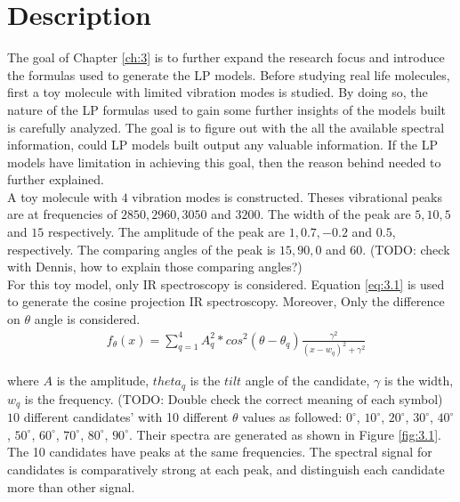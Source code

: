  \label{ch:3}

\section{Description}
The goal of Chapter \ref{ch:3} is to further expand the research focus and introduce the formulas used to generate the LP models. Before studying real life molecules, first a toy molecule with limited vibration modes is studied. By doing so, the nature of the LP formulas used to gain some further insights of the models built is carefully analyzed. The goal is to figure out with the all the available spectral information, could LP models built output any valuable information. If the LP models have limitation in achieving this goal, then the reason behind needed to further explained. \\


A toy molecule with $4$ vibration modes is constructed. Theses vibrational peaks are at frequencies of $2850, 2960, 3050$ and $3200$. The width of the peak are $5, 10, 5$ and $15$ respectively. The amplitude of the peak are $1, 0.7, -0.2$ and $0.5$, respectively. The comparing angles of the peak is $15, 90, 0$ and $60$. (TODO: check with Dennis, how to explain those comparing angles?)  \\

For this toy model, only IR spectroscopy is considered. Equation \ref{eq:3.1} is used to generate the cosine projection IR spectroscopy. Moreover, Only the difference on $\theta$ angle is considered. \\

\begin{eqnarray} \label{eq:3.1}
& f_{\theta}(x) = \displaystyle\sum^{4}_{q=1} A_q^2 * cos^2(\theta - \theta_q)\frac{\gamma^2}{(x- w_q)^2 + \gamma^2} 
\end{eqnarray}

where $A$ is the amplitude, $theta_{q}$ is the $tilt$ angle of the candidate, $\gamma$ is the width, $w_q$ is the frequency. (TODO: Double check the correct meaning of each symbol) $10$ different candidates' with 10 different $\theta$ values as followed: $0^{\circ}$, $10^{\circ}$, $20^{\circ}$, $30^{\circ}$, $40^{\circ}$, $50^{\circ}$, $60^{\circ}$, $70^{\circ}$, $80^{\circ}$, $90^{\circ}$. Their spectra are generated as shown in Figure \ref{fig:3.1}. The 10 candidates have peaks at the same frequencies. The spectral signal for candidates is comparatively strong at each peak, and distinguish each candidate more than other signal. \\

